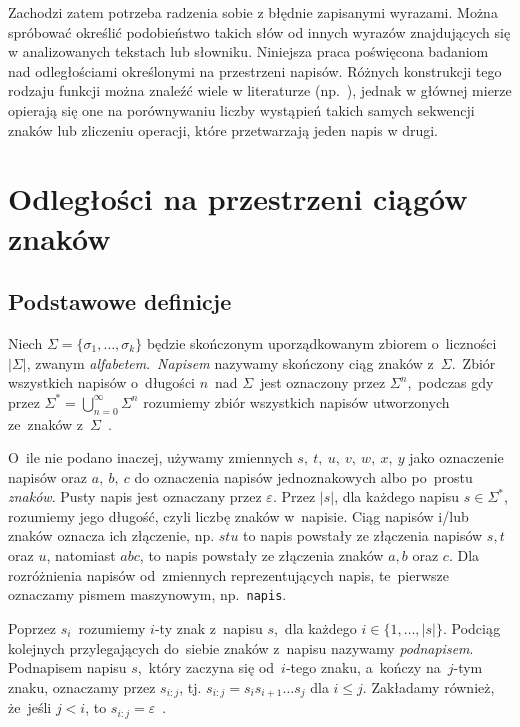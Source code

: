 \documentclass{praca1}
\begin{document}
Zachodzi zatem potrzeba radzenia sobie z błędnie zapisanymi wyrazami. Można spróbować określić podobieństwo takich słów od innych wyrazów znajdujących się w analizowanych tekstach lub słowniku. Niniejsza praca poświęcona badaniom nad odległościami określonymi na przestrzeni napisów. Różnych konstrukcji tego rodzaju funkcji można znaleźć wiele w literaturze (np.~\cite{Levenshtein1965:binarycodes,Boytsov2011:indexingmethods,Navarro2001:guidedtour}), jednak w głównej mierze opierają się one na porównywaniu liczby wystąpień takich samych sekwencji znaków lub zliczeniu operacji, które przetwarzają jeden napis w drugi.


\chapter{Odległości na przestrzeni ciągów znaków}
\label{metryki-na-przestrzeni-ciagow-znakow}


\section{Podstawowe definicje}


\begin{definition}
Niech  $\Sigma = \{\sigma_1, \ldots, \sigma_k\}$ będzie skończonym uporządkowanym zbiorem o~liczności $|\Sigma|$, zwanym \emph{alfabetem}.~\emph{Napisem} nazywamy skończony ciąg znaków z~$\Sigma$.~Zbiór wszystkich napisów o~długości $n$~nad $\Sigma$~jest oznaczony przez $\Sigma^n$,~podczas gdy przez $\Sigma^* = \bigcup_{n=0}^{\infty}\Sigma^n$ rozumiemy zbiór wszystkich napisów utworzonych ze~znaków z~$\Sigma$~\cite{Boytsov2011:indexingmethods}.
\end{definition}

O~ile nie podano inaczej, używamy zmiennych $s,\ t,\ u,\ v,\ w,\ x,\ y$ jako oznaczenie napisów oraz $a,\ b,\ c$ do oznaczenia napisów jednoznakowych albo po~prostu \emph{znaków}. Pusty napis jest oznaczany przez $\varepsilon$. Przez $|s|$, dla każdego napisu $s \in \Sigma^*$, rozumiemy jego długość, czyli liczbę znaków w~napisie. Ciąg napisów i/lub znaków oznacza ich złączenie, np. $stu$ to napis powstały ze złączenia napisów $s, t$ oraz $u$, natomiast $abc$, to napis powstały ze złączenia znaków $a, b$ oraz $c$. Dla rozróżnienia napisów od~zmiennych reprezentujących napis, te~pierwsze oznaczamy pismem maszynowym, np.~\verb|napis|.

Poprzez $s_i$~rozumiemy $i$-ty znak z~napisu $s$,~dla każdego $i \in \{1,\ldots,|s|\}$. Podciąg kolejnych przylegających do~siebie znaków z~napisu nazywamy \emph{podnapisem}. Podnapisem napisu $s$,~który zaczyna się od~$i$-tego znaku, a~kończy na~$j$-tym znaku, oznaczamy przez $s_{i:j}$, tj. $s_{i:j} = s_is_{i+1}\ldots s_j$ dla $i \leq j$. Zakładamy również, że~jeśli $j < i$, to $s_{i:j} = \varepsilon$~\cite{Boytsov2011:indexingmethods,Loo2014:stringdist}.
\end{document}
